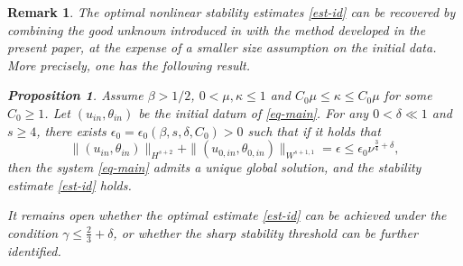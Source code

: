\documentclass[12pt]{article}
\newtheorem{proposition}{Proposition}[section]
\newtheorem{remark}{Remark}[section]
\numberwithin{equation}{section}
\begin{document}
\begin{remark}
		The optimal nonlinear stability estimates \eqref{est-id} can be recovered by combining the good unknown introduced in \cite{CDW24} with the method developed in the present paper, at the expense of a smaller size assumption on the initial data. More precisely, one has the following result.
		\begin{proposition}
			Assume $\beta>1/2$, $0<\mu,\kappa\leq1$ and $C_0\mu\leq\kappa\leq C_0\mu$ for some $C_0\geq1$. Let $(u_{in},\theta_{in})$ be the initial datum of \eqref{eq-main}. For any $0<\delta\ll1$ and $s\geq4$, there exists $\epsilon_0=\epsilon_0(\beta,s,\delta,C_0)>0$ such that if it holds that
			\begin{equation}
				\| (u_{in},\theta_{in})\|_{H^{s+2}}+\|(u_{0,in},\theta_{0,in})\|_{W^{s+1,1}}=\epsilon\leq\epsilon_0\nu^{\frac{3}{4}+\delta},
			\end{equation}
			then the system \eqref{eq-main} admits a unique global solution, and the stability estimate \eqref{est-id} holds.
		\end{proposition}
		  It remains open whether the optimal estimate \eqref{est-id} can be achieved under the condition $\gamma\leq\frac{2}{3}+\delta$, or whether the sharp stability threshold can be further identified.		 
	\end{remark}
    
\end{document}
